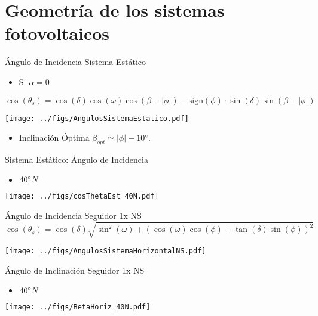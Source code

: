 \documentclass[aspectratio=169, usenames,svgnames,dvipsnames]{beamer}
\begin{document}
\section{Geometría de los sistemas fotovoltaicos}
\label{sec:orgd599eb9}
\begin{frame}[label={sec:org2b30d8b},plain]{Ángulo de Incidencia Sistema Estático}
\begin{itemize}
\item Si \(\alpha=0\)
\end{itemize}
\[
\cos(\theta_{s}) = \cos(\delta)\cos(\omega)\cos(\beta-|\phi|)- \mathrm{sign}(\phi)\cdot\sin(\delta)\sin(\beta-|\phi|)
\]

\begin{center}
\texttt{[image: ../figs/AngulosSistemaEstatico.pdf]}
\end{center}

\begin{itemize}
\item Inclinación Óptima \(\beta_{opt} \simeq |\phi| - 10º\).
\end{itemize}
\end{frame}

\begin{frame}[label={sec:orgffd7c5a}]{Sistema Estático: Ángulo de Incidencia}
\begin{itemize}
\item \(40\degree N\)
\end{itemize}
\begin{center}
\texttt{[image: ../figs/cosThetaEst\_40N.pdf]}
\end{center}
\end{frame}



\begin{frame}[label={sec:org1bf6e7a},plain]{Ángulo de Incidencia Seguidor 1x NS}
\[\cos(\theta_{s})=\cos(\delta)\sqrt{\sin^{2}(\omega)+\left(\cos(\omega)\cos(\phi)+\tan(\delta)\sin(\phi)\right)^{2}}\]

\begin{center}
\texttt{[image: ../figs/AngulosSistemaHorizontalNS.pdf]}
\end{center}
\end{frame}

\begin{frame}[label={sec:orgfdd5dbd}]{Ángulo de Inclinación Seguidor 1x NS}
\begin{itemize}
\item \(40\degree N\)
\end{itemize}
\begin{center}
\texttt{[image: ../figs/BetaHoriz\_40N.pdf]}
\end{center}
\end{frame}
\end{document}
